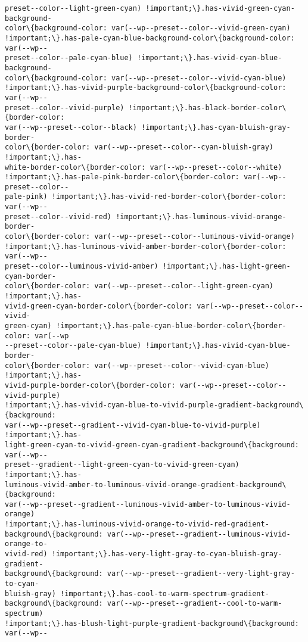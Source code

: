 \documentclass[11pt]{article}
\begin{document}
\begin{Verbatim}[commandchars=\\\{\}]
preset--color--light-green-cyan) !important;\}.has-vivid-green-cyan-background-
color\{background-color: var(--wp--preset--color--vivid-green-cyan)
!important;\}.has-pale-cyan-blue-background-color\{background-color: var(--wp--
preset--color--pale-cyan-blue) !important;\}.has-vivid-cyan-blue-background-
color\{background-color: var(--wp--preset--color--vivid-cyan-blue)
!important;\}.has-vivid-purple-background-color\{background-color: var(--wp--
preset--color--vivid-purple) !important;\}.has-black-border-color\{border-color:
var(--wp--preset--color--black) !important;\}.has-cyan-bluish-gray-border-
color\{border-color: var(--wp--preset--color--cyan-bluish-gray) !important;\}.has-
white-border-color\{border-color: var(--wp--preset--color--white)
!important;\}.has-pale-pink-border-color\{border-color: var(--wp--preset--color--
pale-pink) !important;\}.has-vivid-red-border-color\{border-color: var(--wp--
preset--color--vivid-red) !important;\}.has-luminous-vivid-orange-border-
color\{border-color: var(--wp--preset--color--luminous-vivid-orange)
!important;\}.has-luminous-vivid-amber-border-color\{border-color: var(--wp--
preset--color--luminous-vivid-amber) !important;\}.has-light-green-cyan-border-
color\{border-color: var(--wp--preset--color--light-green-cyan) !important;\}.has-
vivid-green-cyan-border-color\{border-color: var(--wp--preset--color--vivid-
green-cyan) !important;\}.has-pale-cyan-blue-border-color\{border-color: var(--wp
--preset--color--pale-cyan-blue) !important;\}.has-vivid-cyan-blue-border-
color\{border-color: var(--wp--preset--color--vivid-cyan-blue) !important;\}.has-
vivid-purple-border-color\{border-color: var(--wp--preset--color--vivid-purple)
!important;\}.has-vivid-cyan-blue-to-vivid-purple-gradient-background\{background:
var(--wp--preset--gradient--vivid-cyan-blue-to-vivid-purple) !important;\}.has-
light-green-cyan-to-vivid-green-cyan-gradient-background\{background: var(--wp--
preset--gradient--light-green-cyan-to-vivid-green-cyan) !important;\}.has-
luminous-vivid-amber-to-luminous-vivid-orange-gradient-background\{background:
var(--wp--preset--gradient--luminous-vivid-amber-to-luminous-vivid-orange)
!important;\}.has-luminous-vivid-orange-to-vivid-red-gradient-
background\{background: var(--wp--preset--gradient--luminous-vivid-orange-to-
vivid-red) !important;\}.has-very-light-gray-to-cyan-bluish-gray-gradient-
background\{background: var(--wp--preset--gradient--very-light-gray-to-cyan-
bluish-gray) !important;\}.has-cool-to-warm-spectrum-gradient-
background\{background: var(--wp--preset--gradient--cool-to-warm-spectrum)
!important;\}.has-blush-light-purple-gradient-background\{background: var(--wp--

\end{Verbatim}
\end{document}
